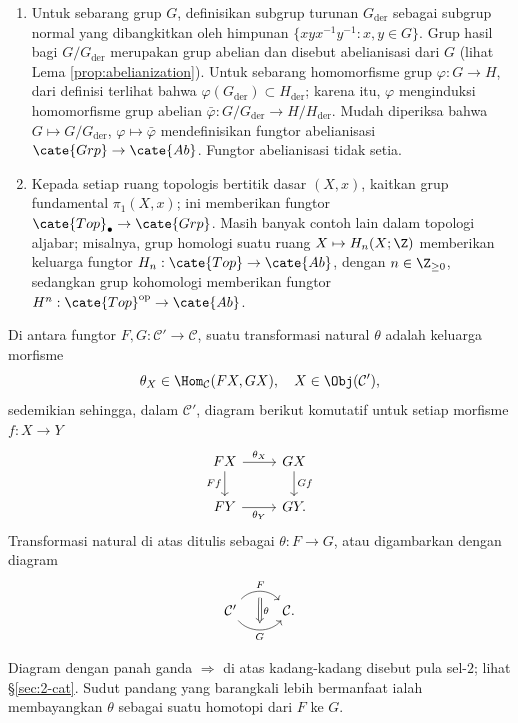 \begin{example}
\begin{enumerate}
			Dengan membatasi $D$ pada ruang vektor berdimensi hingga, diperoleh fungtor $D: \cate{Vect}_f(\Bbbk)^\text{op} \to \cate{Vect}_f(\Bbbk)$ dan $D D^\text{op}: \cate{Vect}_f(\Bbbk) \to \cate{Vect}_f(\Bbbk)$. Keduanya disebut, berturut-turut, fungtor dual dan fungtor dual ganda.
		\item Untuk sebarang grup $G$, definisikan subgrup turunan $G_\text{der}$ sebagai subgrup normal yang dibangkitkan oleh himpunan $\{xyx^{-1} y^{-1} : x,y \in G \}$. Grup hasil bagi $G/G_\text{der}$ merupakan grup abelian dan disebut abelianisasi dari $G$ (lihat Lema \ref{prop:abelianization}). Untuk sebarang homomorfisme grup $\varphi: G \to H$, dari definisi terlihat bahwa $\varphi(G_\text{der}) \subset H_\text{der}$; karena itu, $\varphi$ menginduksi homomorfisme grup abelian $\bar{\varphi}: G/G_\text{der} \to H/H_\text{der}$. Mudah diperiksa bahwa $G \mapsto G/G_\text{der}$, $\varphi \mapsto \bar{\varphi}$ mendefinisikan fungtor abelianisasi $\cate{Grp} \to \cate{Ab}$. Fungtor abelianisasi tidak setia.
		\item Kepada setiap ruang topologis bertitik dasar $(X,x)$, kaitkan grup fundamental $\pi_1(X, x)$; ini memberikan fungtor $\cate{Top}_\bullet \to \cate{Grp}$. Masih banyak contoh lain dalam topologi aljabar; misalnya, grup homologi suatu ruang $X \mapsto H_n(X; \Z)$ memberikan keluarga fungtor $H_n: \cate{Top} \to \cate{Ab}$, dengan $n \in \Z_{\geq 0}$, sedangkan grup kohomologi memberikan fungtor $H^n: \cate{Top}^\text{op} \to \cate{Ab}$.
	\end{enumerate}
\end{example}

\begin{definition}
	Di antara fungtor $F, G: \mathcal{C}' \to \mathcal{C}$, suatu transformasi natural $\theta$ adalah keluarga morfisme
	\[ \theta_X \in \Hom_{\mathcal{C}}(FX, GX), \quad X \in \Obj(\mathcal{C}'), \]
	sedemikian sehingga, dalam $\mathcal{C}'$, diagram berikut komutatif untuk setiap morfisme $f: X \to Y$
	\begin{equation}\label{eqn:naturaltrans-def}\begin{tikzcd}
		FX \arrow[r, "\theta_X"] \ar[d, "Ff"'] & GX \arrow[d, "Gf"] \\
		FY \arrow[r, "\theta_Y"'] & GY .
	\end{tikzcd}\end{equation}
	Transformasi natural di atas ditulis sebagai $\theta: F \to G$, atau digambarkan dengan diagram
	\[ \begin{tikzcd}
		\mathcal{C}' \arrow[bend left=50, r, "F", ""' name=U] \arrow[bend right=50, r, "G"', "" name=D] & \arrow[Rightarrow, to path=(U) -- (D) \tikztonodes, "\theta"] \mathcal{C}.
	\end{tikzcd} \]
\end{definition}
Diagram dengan panah ganda $\Rightarrow$ di atas kadang-kadang disebut pula sel-$2$; lihat \S\ref{sec:2-cat}. Sudut pandang yang barangkali lebih bermanfaat ialah membayangkan $\theta$ sebagai suatu homotopi dari $F$ ke $G$.

